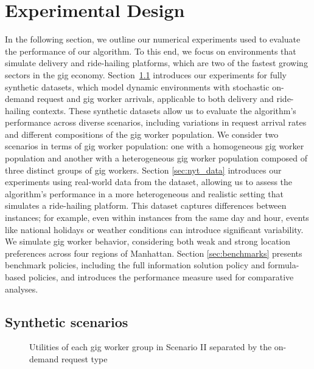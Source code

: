 \section{Experimental Design}
\label{sec:exp_des}

In the following section, we outline our numerical experiments used to evaluate the performance of our algorithm. To this end, we focus on environments that simulate delivery and ride-hailing platforms, which are two of the fastest growing sectors in the gig economy. Section~\ref{sec:syn_data} introduces our experiments for fully synthetic datasets, which model dynamic environments with stochastic on-demand request and gig worker arrivals, applicable to both delivery and ride-hailing contexts. These synthetic datasets allow us to evaluate the algorithm’s performance across diverse scenarios, including variations in request arrival rates and different compositions of the gig worker population. We consider two scenarios in terms of gig worker population: one with a homogeneous gig worker population and another with a heterogeneous gig worker population composed of three distinct groups of gig workers. Section \ref{sec:nyt_data} introduces our experiments using real-world data from the \cite{NYTdata} dataset, allowing us to assess the algorithm’s performance in a more heterogeneous and realistic setting that simulates a ride-hailing platform. This dataset captures differences between instances; for example, even within instances from the same day and hour, events like national holidays or weather conditions can introduce significant variability. We simulate gig worker behavior, considering both weak and strong location preferences across four regions of Manhattan. Section \ref{sec:benchmarks} presents benchmark policies, including the full information solution policy and formula-based policies, and introduces the performance measure used for comparative analyses. 

\subsection{Synthetic scenarios}
\label{sec:syn_data}

\begin{figure}[b!]%
    \centering
    \fontsize{10}{10}\selectfont
    \caption{\textnormal{Utilities of each gig worker group in Scenario II separated by the on-demand request type}}%
    \label{fig:utility_scen_2}%
\end{figure}

